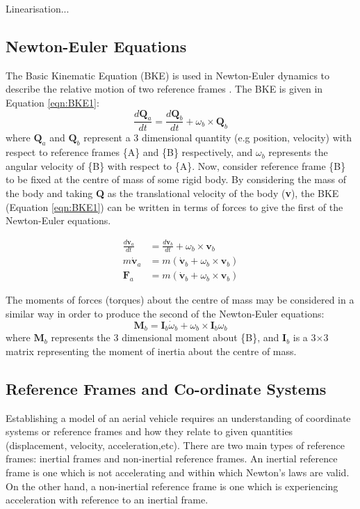 Linearisation...
\subsection{Newton-Euler Equations}
The Basic Kinematic Equation (BKE) is used in Newton-Euler dynamics to describe the relative motion of two reference frames \cite{Ardema2006}. The BKE is given in Equation \ref{eqn:BKE1}:
\begin{equation}\label{eqn:BKE1} 
\frac{d\textbf{Q}_{a}}{dt}=\frac{d\textbf{Q}_{b}}{dt}+\omega_{b} \times \textbf{Q}_{b}
\end{equation}
where $\textbf{Q}_{a}$ and $\textbf{Q}_{b}$ represent a 3 dimensional quantity (e.g position, velocity) with respect to reference frames \{A\} and \{B\} respectively, and $\omega_{b}$ represents the angular velocity of \{B\} with respect to \{A\}. Now, consider reference frame \{B\} to be fixed at the centre of mass of some rigid body. By considering the mass of the body and taking \textbf{Q} as the translational velocity of the body (\textbf{v}), the BKE (Equation \ref{eqn:BKE1}) can be written in terms of forces to give the first of the Newton-Euler equations.

\begin{equation}\label{eqn:BKE2}
\begin{split} 
\frac{d\textbf{v}_{a}}{dt}&=\frac{d\textbf{v}_{b}}{dt}+\omega_{b} \times \textbf{v}_{b}\\
m\dot{\textbf{v}}_{a}&=m(\dot{\textbf{v}}_{b}+\omega_{b} \times \textbf{v}_{b})\\
\textbf{F}_{a}&=m(\dot{\textbf{v}}_{b}+\omega_{b}\times\textbf{v}_{b})
\end{split}
\end{equation}

The moments of forces (torques) about the centre of mass may be considered in a similar way in order to produce the second of the Newton-Euler equations\cite{Ardema2006}:
\begin{equation}\label{eqn:Euler2}
\textbf{M}_{b}=\textbf{I}_{b}\dot{\omega}_{b}+\omega_{b}\times\textbf{I}_{b}\omega_{b}
\end{equation}
where $\textbf{M}_{b}$ represents the 3 dimensional moment about \{B\}, and $\textbf{I}_{b}$ is a 3$\times$3 matrix representing the moment of inertia about the centre of mass.

\subsection{Reference Frames and Co-ordinate Systems}\label{section:RefFrames}
Establishing a model of an aerial vehicle requires an understanding of coordinate systems or reference frames and how they relate to given quantities (displacement, velocity, acceleration,etc). There are two main types of reference frames: inertial frames and non-inertial reference frames. An inertial reference frame is one which is not accelerating and within which Newton's laws are valid\cite{Nebylov2016}. On the other hand, a non-inertial reference frame is one which is experiencing acceleration with reference to an inertial frame.


